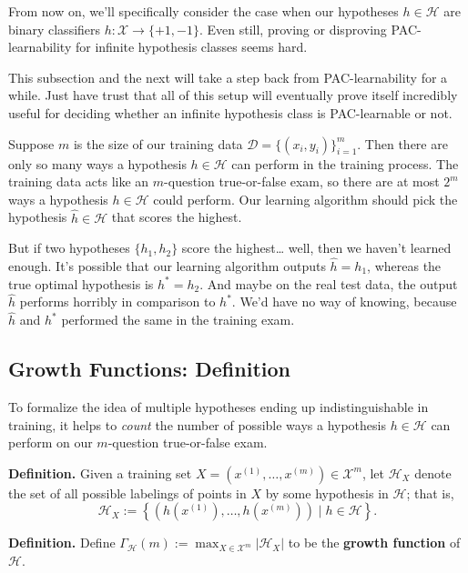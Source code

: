 From now on,
we'll specifically consider the case when
our hypotheses $h \in \mathcal{H}$
are binary classifiers
$h \colon \mathcal{X} \to \{+1, -1\}$.
Even still, proving or disproving PAC-learnability
for infinite hypothesis classes seems hard.

\begin{remark}
    This subsection and the next
    will take a step back from PAC-learnability for a while.
    Just have trust that
    all of this setup will eventually prove itself
    incredibly useful for deciding
    whether an infinite hypothesis class
    is PAC-learnable or not.
\end{remark}

Suppose $m$ is the size of our training data
$\mathcal{D} = \{(x_i, y_i)\}_{i = 1}^m$.
Then there are only so many ways
a hypothesis $h \in \mathcal{H}$ can perform
in the training process.
The training data acts like
an $m$-question true-or-false exam,
so there are at most $2^m$ ways
a hypothesis $h \in \mathcal{H}$ could perform.
Our learning algorithm should
pick the hypothesis $\hat{h} \in \mathcal{H}$
that scores the highest.

But if two hypotheses $\{h_1, h_2\}$ score the highest\dots
well, then we haven't learned enough.
It's possible that our learning algorithm outputs $\hat{h} = h_1$,
whereas the true optimal hypothesis is $h^* = h_2$.
And maybe on the real test data,
the output $\hat{h}$ performs horribly
in comparison to $h^*$.
We'd have no way of knowing,
because $\hat{h}$ and $h^*$ performed the same
in the training exam.

\subsection{Growth Functions: Definition}

To formalize the idea of multiple hypotheses
ending up indistinguishable in training,
it helps to \emph{count}
the number of possible ways
a hypothesis $h \in \mathcal{H}$
can perform on our $m$-question true-or-false exam.

\textbf{Definition.}
Given a training set $X = (x^{(1)}, \dots, x^{(m)}) \in \mathcal{X}^m$,
let $\mathcal{H}_X$ denote the set of all possible
labelings of points in $X$ by some hypothesis in $\mathcal{H}$; that is,
\[ \mathcal{H}_X := \left\{
    \left(h(x^{(1)}), \dots, h(x^{(m)})\right)
    \mid h \in \mathcal{H}
\right\}. \]

\textbf{Definition.}
Define $\Gamma_{\mathcal{H}}(m)
:= \displaystyle \max_{X \in \mathcal{X}^m} |\mathcal{H}_X|$
to be the \textbf{growth function} of $\mathcal{H}$.

